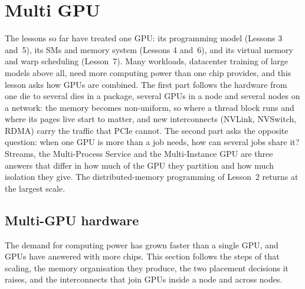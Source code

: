 \documentclass[../main.tex]{subfiles}
\begin{document}
\chapter{Multi GPU}

The lessons so far have treated one GPU: its programming model
(Lessons 3 and~5), its SMs and memory system (Lessons 4 and~6), and its
virtual memory and warp scheduling (Lesson~7).  Many workloads,
datacenter training of large models above all, need more computing power
than one chip provides, and this lesson asks how GPUs are combined.  The
first part follows the hardware from one die to several dies in a
package, several GPUs in a node and several nodes on a network: the
memory becomes non-uniform, so where a thread block runs and where its
pages live start to matter, and new interconnects (NVLink, NVSwitch,
RDMA) carry the traffic that PCIe cannot.  The second part asks the
opposite question: when one GPU is more than a job needs, how can
several jobs share it?  Streams, the Multi-Process Service and the
Multi-Instance GPU are three answers that differ in how much of the GPU
they partition and how much isolation they give.  The distributed-memory
programming of Lesson~2 returns at the largest scale.

\section{Multi-GPU hardware}
\label{sec:l09-hardware}

The demand for computing power has grown faster than a single GPU,
and GPUs have answered with more chips.  This section follows
the steps of that scaling, the memory organisation they produce, the
two placement decisions it raises, and the interconnects that join GPUs
inside a node and across nodes.
\end{document}
